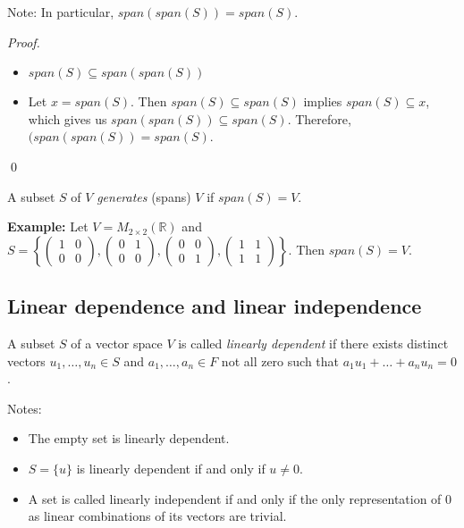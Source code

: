\documentclass[12pt]{article}
\newenvironment{definition}[2][Definition]{\begin{trivlist}
\item[\hskip \labelsep {\bfseries #1}\hskip \labelsep {\bfseries #2}]}{\end{trivlist}}
\newenvironment{sol}
    {\emph{Proof.}
    }
    {
    \qed
    }
\begin{document}
\noindent Note: In particular, $span(span(S)) = span(S)$.

\begin{sol}
\begin{itemize}
    \item[(a)] $span(S) \subseteq span(span(S))$
    
    \item[(b)] Let $x = span(S)$. Then $span(S) \subseteq span(S)$ implies $span(S) \subseteq x$, which gives us $span(span(S)) \subseteq span(S)$. Therefore, $(span(span(S)) = span(S)$.
\end{itemize}
\end{sol}

\begin{definition}{6}
A subset $S$ of $V$ \textit{generates} (spans) $V$ if $span(S) = V$.
\end{definition}

\noindent\textbf{Example:} Let $V = M_{2 \times 2}(\mathbb{R})$ and $S = \left\{\begin{pmatrix}
1 & 0 \\
0 & 0
\end{pmatrix}, \begin{pmatrix}
0 & 1\\
0 & 0
\end{pmatrix}, 
\begin{pmatrix}
0 & 0\\
0 & 1
\end{pmatrix}, 
\begin{pmatrix}
1 & 1\\
1 & 1
\end{pmatrix}\right\}$. Then $span(S) = V$.

\subsection{Linear dependence and linear independence}

\begin{definition}{7}
A subset $S$ of a vector space $V$ is called \textit{linearly dependent} if there exists distinct vectors $u_1, \dots, u_n \in S$ and $a_1, \dots, a_n \in F$ not all zero such that $a_1u_1 + \dots + a_nu_n = 0$.
\end{definition}

\noindent Notes:
\begin{itemize}
    \item The empty set is linearly dependent.
    \item $S = \{u\}$ is linearly dependent if and only if $u \neq 0$.
    \item A set is called linearly independent if and only if the only representation of 0 as linear combinations of its vectors are trivial.
\end{itemize}
\end{document}
